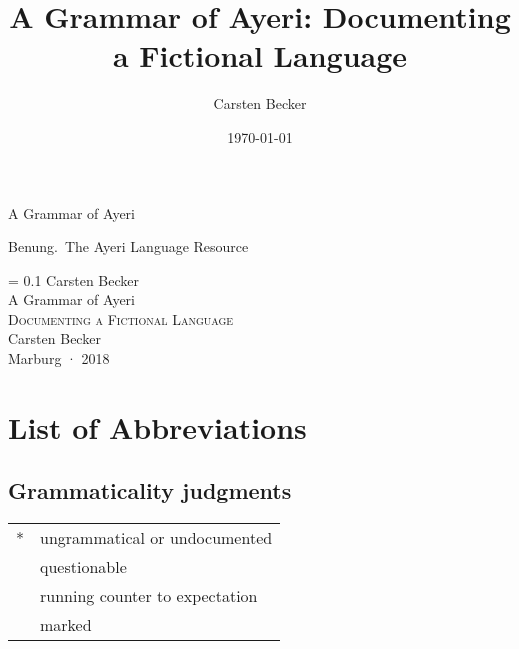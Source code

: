 \documentclass[
	a4paper,
	11pt,
	openany,
	twoside,
	oldfontcommands, %
]{memoir}
\author{Carsten Becker}
\title{A Grammar of Ayeri: Documenting a Fictional Language}
\date{\today}
\newlength\drop
\newcommand*{\titleS}{\begingroup%
\drop = 0.1\textheight
\centering
\vspace*{\drop}
{\large Carsten Becker}\\[2\baselineskip]
{\Huge A Grammar of Ayeri}\\[\baselineskip]
{\Large\scshape Documenting a Fictional Language}\\[\baselineskip]
\vfill
{Carsten Becker\\ Marburg · 2018}\par
\vspace*{\drop}
\endgroup}
\newcommand{\excl}{\fakesuperscript{!}} %
\newcommand{\hash}{\fakesuperscript{\#}} %
\newcommand{\ques}{\fakesuperscript{?}} %
\newcommand{\Lfg}{\textsc{lfg}}
\begin{document}

\frontmatter

\begin{titlingpage*}
\begin{center}
{\Huge A Grammar of Ayeri}
\end{center}
\clearpage
{\Large Benung.\ The Ayeri Language Resource}
\end{titlingpage*}


\begin{titlingpage*}
\titleS
\clearpage

\end{titlingpage*}


\begin{KeepFromToc}
  \tableofcontents
\end{KeepFromToc}
\clearpage

\listoffigures
\clearpage

\listoftables

\chapter{List of Abbreviations}
\begingroup\multicolsep=0pt
\printglossary[style=mysuper, type=leipzig, title={Glossing abbreviations}]
\printglossary[style=mysuper, type=lfg, title={\Lfg{}-specific abbreviations}]
\endgroup
\bigskip

\section*{Grammaticality judgments}
\noindent \begin{tabular}[t]{@{} l l}
*		& ungrammatical or undocumented \\
\ques	& questionable \\
\excl	& running counter to expectation \\
\hash	& marked \\
\end{tabular}
\cleartorecto


\cleartorecto

\end{document}
